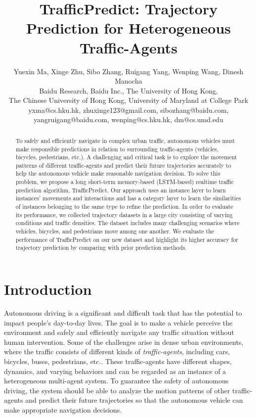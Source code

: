 \documentclass[letterpaper]{article} \usepackage{aaai19}  \usepackage{times}  \usepackage{helvet}  \usepackage{courier}  \usepackage{url}  \usepackage{graphicx}  \usepackage{amsmath}
\begin{document}
\title{TrafficPredict: Trajectory Prediction for Heterogeneous Traffic-Agents}
\author{Yuexin Ma, Xinge Zhu, Sibo Zhang, Ruigang Yang, Wenping Wang, Dinesh Manocha\\
Baidu Research, Baidu Inc., The University of Hong Kong,\\
The Chinese University of Hong Kong, University of Maryland at College Park\\
yxma@cs.hku.hk, zhuxinge123@gmail.com, sibozhang@baidu.com, \\
yangruigang@baidu.com, wenping@cs.hku.hk, dm@cs.umd.edu\\
}





\maketitle
\begin{abstract}
To safely and efficiently navigate in complex urban traffic, autonomous vehicles must make responsible predictions in relation to surrounding traffic-agents (vehicles, bicycles, pedestrians, etc.). A challenging and critical task is to explore the movement patterns of different traffic-agents and predict their future trajectories accurately to help the autonomous vehicle make reasonable navigation decision. To solve this problem, we propose a long short-term memory-based (LSTM-based) realtime traffic prediction algorithm, TrafficPredict. Our approach uses an instance layer to learn instances' movements and interactions and has a category layer to learn the similarities of instances belonging to the same type to refine the prediction. In order to evaluate its performance, we collected trajectory datasets in a large city consisting of varying conditions and traffic densities. The dataset includes many challenging scenarios where vehicles, bicycles, and pedestrians move among one another. We evaluate the performance of TrafficPredict on our new dataset and highlight its higher accuracy for trajectory prediction by comparing with prior prediction methods. 
\end{abstract}


\section{Introduction}
Autonomous driving is a significant and difficult task that has the potential to impact people’s day-to-day lives. The goal is to make a vehicle perceive the environment and safely and efficiently navigate any traffic situation without human intervention. Some of the challenges arise in dense urban environments, where the traffic consists of different kinds of {\em traffic-agents}, including cars, bicycles, buses, pedestrians, etc.. These traffic-agents have different shapes, dynamics, and varying behaviors and can be regarded as an instance of a heterogeneous multi-agent system. To guarantee the safety of autonomous driving, the system should be able to analyze the motion patterns of other traffic-agents and predict their future trajectories so that the autonomous vehicle can make appropriate navigation decisions. 
\end{document}
